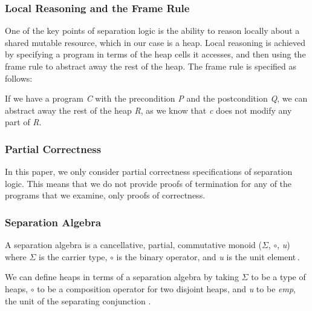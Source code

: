 \subsubsection{Local Reasoning and the Frame Rule}
One of the key points of separation logic is the ability to reason locally about a shared mutable resource, which in our case is a heap. Local reasoning is achieved by specifying a program in terms of the heap cells  it accesses, and then using the frame rule to abstract away the rest of the heap. The frame rule is specified as follows:

\begin{prooftree}
\end{prooftree}

If we have a program {\it C} with the precondition {\it P} and the postcondition {\it Q}, we can abstract away the rest of the heap {\it R}, as we know that {\it c} does not modify any part of {\it R}.

\subsubsection{Partial Correctness}
In this paper, we only consider partial correctness specifications of separation logic. This means that we do not provide proofs of termination for any of the programs that we examine, only proofs of correctness.


\subsubsection{Separation Algebra}
A separation algebra is a cancellative, partial, commutative monoid ($\Sigma$, $\circ$, {\it u}) where $\Sigma$ is the carrier type, $\circ$ is the binary operator, and {\it u} is the unit element\,\cite{Calcagno07:LCS}.

We can define heaps in terms of a separation algebra by taking $\Sigma$ to be a type of heaps, $\circ$ to be a composition operator for two disjoint heaps, and {\it u} to be {\it emp}, the unit of the separating conjunction \cite{BirkedalL:veroop-conf}.

